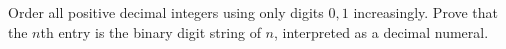 Order all positive decimal integers using only digits $0,1$ increasingly. Prove that the $n$th entry is the binary digit string of $n$, interpreted as a decimal numeral.
